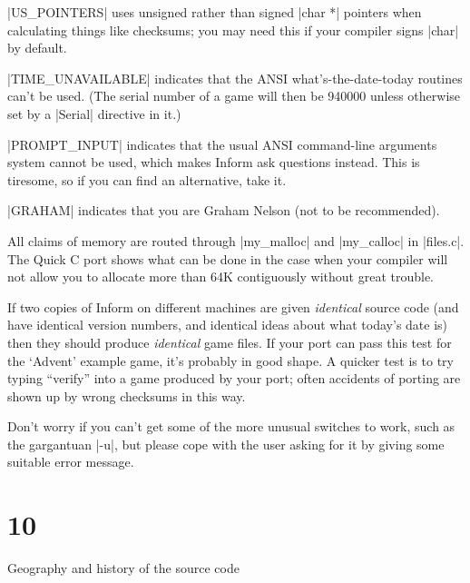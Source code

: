 |US_POINTERS| uses unsigned rather than signed |char *| pointers when
calculating things like checksums; you may need this if your compiler
signs |char| by default.

|TIME_UNAVAILABLE| indicates that the ANSI what's-the-date-today routines
can't be used.  (The serial number of a game will then be 940000 unless
otherwise set by a |Serial| directive in it.)

|PROMPT_INPUT| indicates that the usual ANSI command-line arguments
system cannot be used, which makes Inform ask questions instead.  This
is tiresome, so if you can find an alternative, take it.

|GRAHAM| indicates that you are Graham Nelson (not to be recommended).

\medskip
All claims of memory are routed through |my_malloc| and |my_calloc|
in |files.c|.  The Quick C port shows what can be done in the case when
your compiler will not allow you to allocate more than 64K contiguously
without great trouble.

\medskip
If two copies of Inform on different machines are given
{\sl identical} source code (and have identical version numbers, and
identical ideas about what today's date is) then they should produce
{\sl identical} game files.  If your port can pass this test for the
`Advent' example game, it's probably in good shape.  A quicker test
is to try typing ``verify'' into a game produced by your port; often
accidents of porting are shown up by wrong checksums in this way.

Don't worry if you can't get some of the more unusual switches to work,
such as the gargantuan |-u|, but please cope with the user asking for
it by giving some suitable error message.

\section{10}{Geography and history of the source code}

